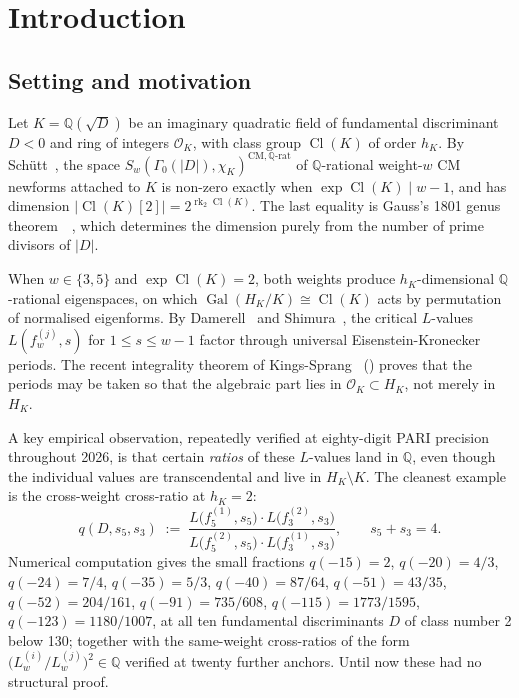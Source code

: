 \documentclass[11pt]{amsart}
\theoremstyle{definition}
\theoremstyle{remark}
\DeclareMathOperator{\Cl}{Cl}
\DeclareMathOperator{\rk}{rk}
\DeclareMathOperator{\Gal}{Gal}
\newcommand{\Q}{\mathbb{Q}}
\newcommand{\OK}{\mathcal{O}_K}
\newcommand{\HK}{H_K}
\newcommand{\chiK}{\chi_K}
\begin{document}
\tableofcontents

\section{Introduction}\label{sec:intro}

\subsection{Setting and motivation}
\label{ss:setting}
Let $K = \Q(\sqrt{D})$ be an imaginary quadratic field of fundamental
discriminant $D < 0$ and ring of integers $\OK$, with class group
$\Cl(K)$ of order $h_K$. By Sch\"utt~\cite{Schutt2008}, the space
$S_w(\Gamma_0(|D|), \chiK)^{\mathrm{CM}, \Q\text{-rat}}$ of
$\Q$-rational weight-$w$ CM newforms attached to $K$ is non-zero exactly
when $\exp \Cl(K) \mid w - 1$, and has dimension $|\Cl(K)[2]|
= 2^{\rk_2 \Cl(K)}$. The last equality is Gauss's 1801 genus
theorem~\cite{Gauss1801}~\cite[Thm.\ 3.15]{Cox1989}, which determines
the dimension purely from the number of prime divisors of $|D|$.

When $w \in \{3, 5\}$ and $\exp \Cl(K) = 2$, both weights produce
$h_K$-dimensional $\Q$-rational eigenspaces, on which $\Gal(\HK/K)
\cong \Cl(K)$ acts by permutation of normalised eigenforms. By
Damerell~\cite{Damerell1971} and Shimura~\cite{Shimura1976}, the
critical $L$-values $L(f_w^{(j)}, s)$ for $1 \leq s \leq w - 1$ factor
through universal Eisenstein-Kronecker periods. The recent integrality
theorem of Kings-Sprang~\cite{KingsSprang2025} (\cite{KingsSprangArxiv})
proves that the periods may be taken so that the algebraic part lies in
$\OK \subset \HK$, not merely in $\HK$.

A key empirical observation, repeatedly verified at eighty-digit PARI
precision throughout 2026, is that certain \emph{ratios} of these
$L$-values land in $\Q$, even though the individual values are
transcendental and live in $\HK \setminus K$. The cleanest example is
the cross-weight cross-ratio at $h_K = 2$:
\begin{equation}\label{eq:q-canonical}
q(D, s_5, s_3) \; := \; \frac{L\bigl(f_5^{(1)}, s_5\bigr) \cdot
L\bigl(f_3^{(2)}, s_3\bigr)}
{L\bigl(f_5^{(2)}, s_5\bigr) \cdot L\bigl(f_3^{(1)}, s_3\bigr)},
\qquad s_5 + s_3 = 4.
\end{equation}
Numerical computation gives the small fractions
$q(-15) = 2$, $q(-20) = 4/3$, $q(-24) = 7/4$, $q(-35) = 5/3$,
$q(-40) = 87/64$, $q(-51) = 43/35$, $q(-52) = 204/161$,
$q(-91) = 735/608$, $q(-115) = 1773/1595$, $q(-123) = 1180/1007$,
at all ten fundamental discriminants $D$ of class number 2 below 130;
together with the same-weight cross-ratios of the form
$\bigl(L_w^{(i)}/L_w^{(j)}\bigr)^2 \in \Q$ verified at twenty further
anchors. Until now these had no structural proof.
\end{document}
